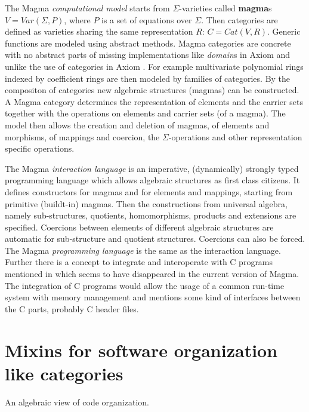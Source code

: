 \documentclass{llncs}
\begin{document}
The Magma {\em computational model} starts from $\Sigma$-varieties
called {\bf magma}s $V = Var(\Sigma,P)$, where $P$ is a set of
equations over $\Sigma$. Then categories are defined as varieties
sharing the same representation $R$: $C = Cat(V,R)$. Generic functions
are modeled using abstract methods.
Magma categories are concrete with no abstract parts of missing
implementations like {\em domain}s in Axiom and unlike the use of
categories in Axiom \cite{JenksSutor:1992}.  For example multivariate
polynomial rings indexed by coefficient rings are then modeled by
families of categories.  By the compositon of categories new algebraic
structures (magmas) can be constructed. A Magma category determines
the representation of elements and the carrier sets together with the
operations on elements and carrier sets (of a magma).
%
The model then allows the creation and deletion of magmas, of elements
and morphisms, of mappings and coercion, the $\Sigma$-operations and
other representation specific operations.

The Magma {\em interaction language} is an imperative, (dynamically)
strongly typed programming language which allows algebraic structures
as first class citizens. It defines constructors for magmas and for
elements and mappings, starting from primitive (buildt-in) magmas.
Then the constructions from universal algebra, namely sub-structures,
quotients, homomorphisms, products and extensions are specified.
Coercions between elements of different algebraic structures are
automatic for sub-structure and quotient structures.  Coercions can
also be forced. %
The Magma {\em programming language} is the same as the interaction
language. Further there is a concept to integrate and interoperate
with C programs mentioned in \cite{BosmaCannonMatthews:1994} which
seems to have disappeared in the current version of Magma.  The
integration of C programs would allow the usage of a common run-time
system with memory management and mentions some kind of interfaces
between the C parts, probably C header files.



\section{Mixins for software organization like categories} %
\label{sec:mixin}

An algebraic view of code organization.
\end{document}
